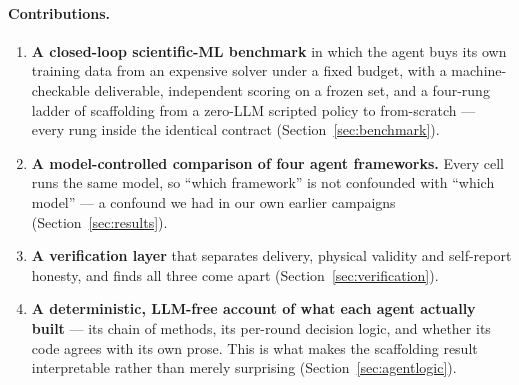\paragraph{Contributions.}
\begin{enumerate}
\item \textbf{A closed-loop scientific-ML benchmark} in which the agent buys its
  own training data from an expensive solver under a fixed budget, with a
  machine-checkable deliverable, independent scoring on a frozen set, and a
  four-rung ladder of scaffolding from a zero-LLM scripted policy to
  from-scratch --- every rung inside the identical contract
  (Section~\ref{sec:benchmark}).
\item \textbf{A model-controlled comparison of four agent frameworks.} Every
  cell runs the same model, so ``which framework'' is not confounded with
  ``which model'' --- a confound we had in our own earlier campaigns
  (Section~\ref{sec:results}).
\item \textbf{A verification layer} that separates delivery, physical validity
  and self-report honesty, and finds all three come apart
  (Section~\ref{sec:verification}).
\item \textbf{A deterministic, LLM-free account of what each agent actually
  built} --- its chain of methods, its per-round decision logic, and whether its
  code agrees with its own prose. This is what makes the scaffolding result
  interpretable rather than merely surprising (Section~\ref{sec:agentlogic}).
\end{enumerate}
